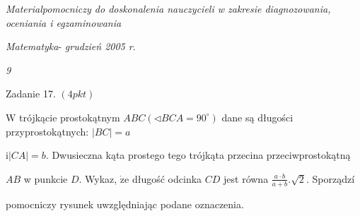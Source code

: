 \documentclass[a4paper,12pt]{article}
\begin{document}
{\it Materialpomocniczy do doskonalenia nauczycieli w zakresie diagnozowania, oceniania i egzaminowania}

{\it Matematyka}- {\it grudzień 2005 r}.

{\it 9}

Zadanie 17. $(4pkt)$

$\mathrm{W}$ trójkącie prostokątnym $ABC(\triangleleft BCA=90^{\circ})$ dane są długości przyprostokątnych: $|BC|=a$

$\mathrm{i} |CA|=b$. Dwusieczna kąta prostego tego trójkąta przecina przeciwprostokątną

$AB$ w punkcie $D$. Wykaz, $\dot{\mathrm{z}}\mathrm{e}$ długość odcinka $CD$ jest równa $\displaystyle \frac{a\cdot b}{a+b}.\sqrt{2}$. Sporządzí

pomocniczy rysunek uwzględniając podane oznaczenia.
\end{document}
